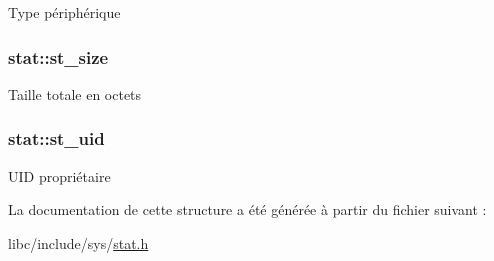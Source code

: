 Type périphérique \hypertarget{structstat_a040e19c8b9766f841fde8786ce9297bf}{
\subsubsection[{st\-\_\-size}]{ stat\-::st\-\_\-size}}\label{structstat_a040e19c8b9766f841fde8786ce9297bf}
Taille totale en octets \hypertarget{structstat_a4a8708a3d18be60ee7b2f06c4cab0c70}{
\subsubsection[{st\-\_\-uid}]{ stat\-::st\-\_\-uid}}\label{structstat_a4a8708a3d18be60ee7b2f06c4cab0c70}
U\-I\-D propriétaire 

La documentation de cette structure a été générée à partir du fichier suivant \-:\begin{DoxyCompactItemize}
\item 
libc/include/sys/\hyperlink{stat_8h}{stat.\-h}\end{DoxyCompactItemize}
